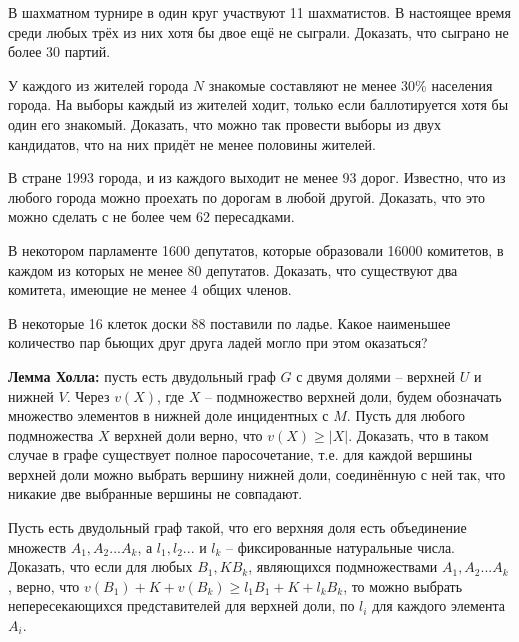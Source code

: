 
\begin{thm}
    В шахматном турнире в один круг участвуют 11 шахматистов. В настоящее время среди любых трёх из них хотя бы двое ещё не сыграли. Доказать, что сыграно не более 30 партий.
\end{thm}

\begin{thm}
    У каждого из жителей города $N$ знакомые составляют не менее 30\% населения города. На выборы каждый из жителей ходит, только если баллотируется хотя бы один его знакомый. Доказать, что можно так провести выборы из двух кандидатов, что на них придёт не менее половины жителей.
\end{thm}

\begin{thm}
    В стране 1993 города, и из каждого выходит не менее 93 дорог. Известно, что из любого города можно проехать по дорогам в любой другой. Доказать, что это можно сделать с не более чем 62 пересадками.
\end{thm}

\begin{thm}
    В некотором парламенте 1600 депутатов, которые образовали 16000 комитетов, в каждом из которых не менее 80 депутатов. Доказать, что существуют два комитета, имеющие не менее 4 общих членов.
\end{thm}

\begin{thm}
    В некоторые 16 клеток доски 88 поставили по ладье. Какое наименьшее количество пар бьющих друг друга ладей могло при этом оказаться?
\end{thm}

\begin{thm}
    \textbf{Лемма Холла:} пусть есть двудольный граф $G$ с двумя долями -- верхней $U$ и нижней $V$. Через $v(X)$, где $X$ -- подмножество верхней доли, будем обозначать множество элементов в нижней доле инцидентных с $M$. Пусть для любого подмножества $X$ верхней доли верно, что $v(X) \geq |X|$. Доказать, что в таком случае в графе существует полное паросочетание, т.е. для каждой вершины верхней доли можно выбрать вершину нижней доли, соединённую с ней так, что никакие две выбранные вершины не совпадают.
\end{thm}

\begin{thm}
    Пусть есть двудольный граф такой, что его верхняя доля есть объединение множеств $A_1, A_2 ... A_k$, а $l_1, l_2 ...$ и $l_k$ -- фиксированные натуральные числа. Доказать, что если для любых $B_1, K B_k$, являющихся подмножествами $A_1, A_2 ... A_k$, верно, что $v(B_1) + K + v(B_k) \geq l_1 B_1 + K + l_k B_k$, то можно выбрать непересекающихся представителей для верхней доли, по $l_i$ для каждого элемента $A_i$.
\end{thm}

